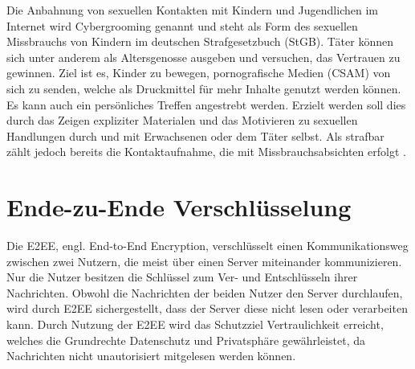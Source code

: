 Die Anbahnung von sexuellen Kontakten mit Kindern und Jugendlichen im Internet wird Cybergrooming genannt und steht als Form des sexuellen Missbrauchs von Kindern im deutschen Strafgesetzbuch (StGB). Täter können sich unter anderem als Altersgenosse ausgeben und versuchen, das Vertrauen zu gewinnen. Ziel ist es, Kinder zu bewegen, pornografische Medien (\ac{CSAM}) von sich zu senden, welche als Druckmittel für mehr Inhalte genutzt werden können. Es kann auch ein persönliches Treffen angestrebt werden. Erzielt werden soll dies durch das Zeigen expliziter Materialen und das Motivieren zu sexuellen Handlungen durch und mit Erwachsenen oder dem Täter selbst. Als strafbar zählt jedoch bereits die Kontaktaufnahme, die mit Missbrauchsabsichten erfolgt \cite{bka:grooming}.

\section{Ende-zu-Ende Verschlüsselung}
\label{sec:Grundlagen:DefE2E}

Die \ac{E2EE}, engl. \glqq End-to-End Encryption\grqq{}, verschlüsselt einen Kommunikationsweg zwischen zwei Nutzern, die meist über einen Server miteinander kommunizieren. Nur die Nutzer besitzen die Schlüssel zum Ver- und Entschlüsseln ihrer Nachrichten. Obwohl die Nachrichten der beiden Nutzer den Server durchlaufen, wird durch \ac{E2EE} sichergestellt, dass der Server diese nicht lesen oder verarbeiten kann. Durch Nutzung der \ac{E2EE} wird das Schutzziel Vertraulichkeit erreicht, welches die Grundrechte Datenschutz und Privatsphäre gewährleistet, da Nachrichten nicht unautorisiert mitgelesen werden können\cite{alatawi:2023, portnoy:2019}.